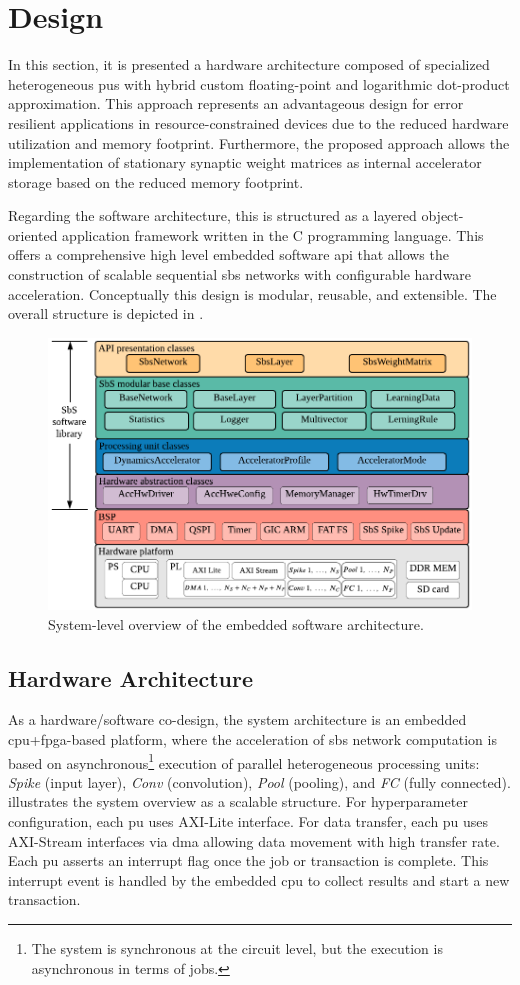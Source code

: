 \section{Design}
\label{sec:system_design}

	In this section, it is presented a hardware architecture composed of specialized heterogeneous \glspl{pu} with hybrid custom floating-point and logarithmic dot-product approximation. This approach represents an advantageous design for error resilient applications in resource-constrained devices due to the reduced hardware utilization and memory footprint. Furthermore, the proposed approach allows the implementation of stationary synaptic weight matrices as internal accelerator storage based on the reduced memory footprint.
	

Regarding the software architecture, this is structured as a
layered object-oriented application framework written in the C programming language. This offers a comprehensive high level embedded software \gls{api} that allows the construction of scalable sequential \gls{sbs} networks with configurable hardware acceleration. Conceptually this design is modular, reusable, and extensible. The overall structure is depicted in .

\begin{figure}[b!]
	\centering
	\includegraphics[width=0.5\columnwidth]{./chapters/sbs_accelerator/figures/sbs_software_component.pdf}
	\caption{System-level overview of the embedded software architecture.}
	\label{fig:sbs_sw_stack}
\end{figure}

\subsection{Hardware Architecture} \label{Hardware_architecture}
As a hardware/software co-design, the system architecture is an embedded \gls{cpu}+\gls{fpga}-based platform, where the acceleration of \gls{sbs} network computation is based on asynchronous\footnote{The system is synchronous at the circuit level, but the execution is asynchronous in terms of jobs.} execution of parallel heterogeneous processing units: \emph{Spike} (input layer), \emph{Conv} (convolution), \emph{Pool} (pooling), and \emph{FC} (fully connected).  illustrates the system overview as a scalable structure. For hyperparameter configuration, each \gls{pu} uses AXI-Lite interface. For data transfer, each \gls{pu} uses AXI-Stream interfaces via \gls{dma} allowing data movement with high transfer rate. Each \gls{pu} asserts an interrupt flag once the job or transaction is complete. This interrupt event is handled by the embedded \gls{cpu} to collect results and start a new transaction.

